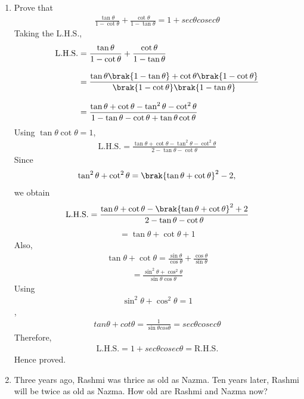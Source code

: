 \begin{enumerate}[label=\thesubsection.\arabic*, ref=\thesubsection.\theenumi]
\item
Prove that
\begin{align}
\frac{\tan\theta}{1-\cot\theta}
+
\frac{\cot\theta}{1-\tan\theta}
=
1+sec\theta cosec\theta
\end{align}
\solution
Taking the L.H.S.,
\begin{align}
\begin{aligned}
\text{L.H.S.}
&= \frac{\tan\theta}{1-\cot\theta}
+ \frac{\cot\theta}{1-\tan\theta}
\\[8pt]
&= \frac{\tan\theta\brak{1-\tan\theta}
+\cot\theta\brak{1-\cot\theta}}
{\brak{1-\cot\theta}\brak{1-\tan\theta}}
\\[8pt]
&= \frac{\tan\theta+\cot\theta-\tan^2\theta-\cot^2\theta}
{1-\tan\theta-\cot\theta+\tan\theta\cot\theta}
\end{aligned}
\end{align}
Using \(\tan\theta\cot\theta=1\),
\begin{align}
\text{L.H.S.}
=
\frac{\tan\theta+\cot\theta-\tan^2\theta-\cot^2\theta}
{2-\tan\theta-\cot\theta}
\end{align}
Since
\begin{align}
\tan^2\theta+\cot^2\theta
=\brak{\tan\theta+\cot\theta}^2-2,
\end{align}
we obtain
\begin{align}
\text{L.H.S.}
=
\frac{\tan\theta+\cot\theta-\brak{\tan\theta+\cot\theta}^2+2}
{2-\tan\theta-\cot\theta}
\end{align}
\begin{align}
= \tan\theta+\cot\theta+1
\end{align}
Also,
\begin{align}
\tan\theta+\cot\theta
=\frac{\sin\theta}{\cos\theta}
+\frac{\cos\theta}{\sin\theta}
\end{align}
\begin{align}
=\frac{\sin^2\theta+\cos^2\theta}
{\sin\theta\cos\theta}
\end{align}
Using 
\begin{align}
\sin^2\theta + \cos^2\theta=1
\end{align},
\begin{align}
tan\theta+cot\theta = \frac{1}{\sin\theta cos\theta} = sec\theta cosec\theta
\end{align}
Therefore,
\begin{align}
\text{L.H.S.}=1+ sec\theta cosec\theta
=\text{R.H.S.}
\end{align}
Hence proved.

\item
 Three years ago, Rashmi was thrice as old as Nazma. Ten years later, Rashmi will be twice as old as Nazma. How old are Rashmi and Nazma now?


\end{enumerate}
